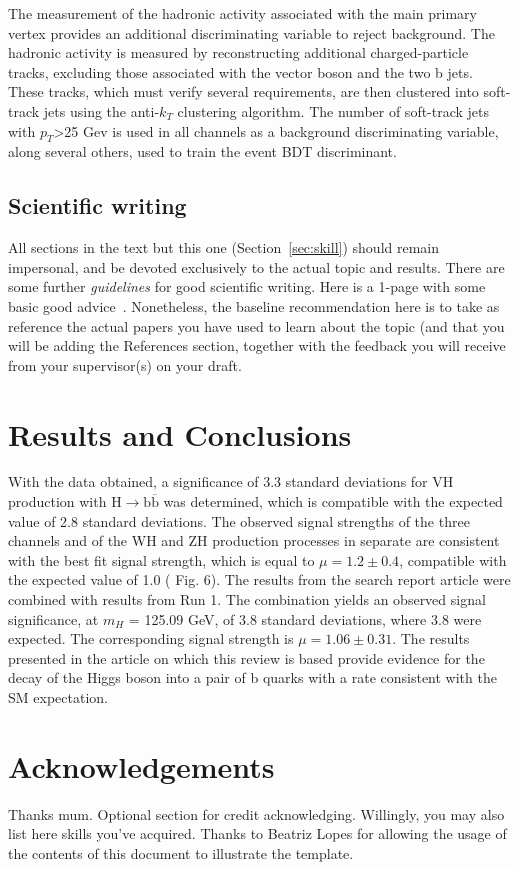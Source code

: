 \documentclass[EPJ,twocolumn]{webofc}
\begin{document}
The measurement of the hadronic activity associated with the main primary vertex provides an additional discriminating variable to reject background. The hadronic activity is measured by reconstructing additional charged-particle tracks, excluding those associated with the vector boson and the two b jets. These tracks, which must verify several requirements, are then clustered into soft-track jets using the anti-$k_T$ clustering algorithm. The number of soft-track jets with $p_{T}$>25 Gev is used in all channels as a background discriminating variable, along several others, used to train the event BDT discriminant.

\subsection*{Scientific writing}
All sections in the text but this one (Section~\ref{sec:skill}) should remain impersonal, and be devoted exclusively to the actual topic and results. There are some further \emph{guidelines} for good scientific writing. Here is a 1-page with some basic good advice~\cite{budker}. Nonetheless, the baseline recommendation here is to take as reference the actual papers you have used to learn about the topic (and that you will be adding the References section, together with the feedback you will receive from your supervisor(s) on your draft.  

\section{Results and Conclusions}

With the data obtained, a significance of 3.3 standard deviations for VH production with $\text{H} \rightarrow \text{b}\overline{\text{b}}$ was determined, which is compatible with the expected value of 2.8 standard deviations. The observed signal strengths of the three channels and of the WH and ZH production processes in separate are consistent with the best fit signal strength, which is equal to $\mu=1.2 \pm 0.4$, compatible with the expected value of 1.0 (\cite{artigo} Fig. 6).
The results from the search report article were combined with results from Run 1. The combination yields an
observed signal significance, at $m_H$ = 125.09 GeV, of 3.8 standard deviations, where 3.8 were expected. The corresponding signal strength is $\mu = 1.06\pm0.31$. The results presented in the article on which this review is based provide evidence for the decay of the Higgs boson into a pair of b quarks with a rate consistent with the SM expectation. 

\section*{Acknowledgements}
Thanks mum. Optional section for credit acknowledging.
%
Willingly, you may also list here skills you've acquired.
%
Thanks to Beatriz Lopes for allowing the usage of the contents of this document to illustrate the template.


%
\end{document}
